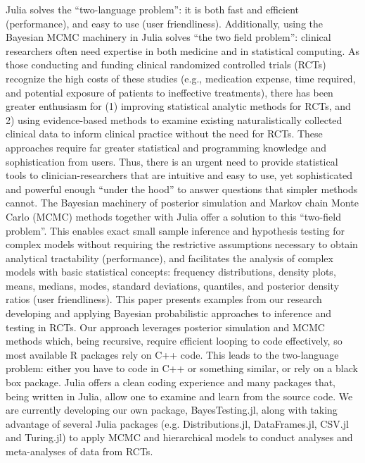 \documentclass{juliacon}
\begin{document}
Julia solves the “two-language problem”: it is both fast and efficient (performance), and easy to use (user friendliness).\cite{bezanson2017julia}  Additionally, using the Bayesian MCMC machinery in Julia solves “the two field problem”: clinical researchers often need expertise in both medicine and in statistical computing.  
\vskip 6pt
As those conducting and funding clinical randomized controlled trials (RCTs) recognize the high costs of these studies (e.g., medication expense, time required, and potential exposure of patients to ineffective treatments), there has been greater enthusiasm for (1) improving statistical analytic methods for RCTs, and 2) using evidence-based methods to examine existing naturalistically collected clinical data to inform clinical practice without the need for RCTs.  These approaches require far greater statistical and programming knowledge and sophistication from users.  Thus, there is an urgent need to provide statistical tools to clinician-researchers that are intuitive and easy to use, yet sophisticated and powerful enough “under the hood” to answer questions that simpler methods cannot.
\vskip 6pt
The Bayesian machinery of posterior simulation and Markov chain Monte Carlo (MCMC) methods together with Julia offer a solution to this “two-field problem”. This enables exact small sample inference and hypothesis testing for complex models without requiring the restrictive assumptions necessary to obtain analytical tractability (performance), and facilitates the analysis of complex models with basic statistical concepts: frequency distributions, density plots, means, medians, modes, standard deviations, quantiles, and posterior density ratios (user friendliness).\cite{Mills2019} 
\vskip 6pt
This paper presents examples from our research developing and applying Bayesian probabilistic approaches to inference and testing in RCTs.\cite{Mills2019, Strawn2019, Strawn2018, Strawn2017, Strawn2018a} Our approach leverages posterior simulation and MCMC methods which, being recursive, require efficient looping to code effectively, so most available R packages rely on C++ code.  This leads to the two-language problem: either you have to code in C++ or something similar, or rely on a black box package.  Julia offers a clean coding experience and many packages that, being written in Julia, allow one to examine and learn from the source code.  We are currently developing our own package, BayesTesting.jl,\cite{Mills2018} along with taking advantage of several Julia packages (e.g. Distributions.jl, DataFrames.jl, CSV.jl and Turing.jl) to apply MCMC and hierarchical models to conduct analyses and meta-analyses of data from RCTs.\cite{Strawn2019}
\end{document}
